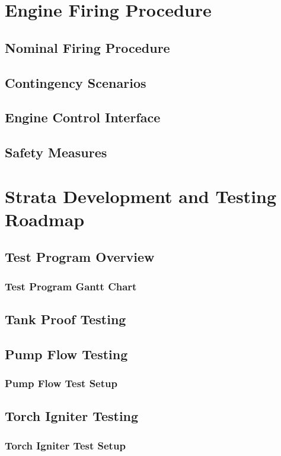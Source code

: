 \documentclass[12pt, letterpaper]{article}
\begin{document}
\section{Engine Firing Procedure}
\subsection{Nominal Firing Procedure}
\subsection{Contingency Scenarios}
\subsection{Engine Control Interface}
\subsection{Safety Measures}

\newpage

\section{Strata Development and Testing Roadmap}
\subsection{Test Program Overview}
\subsubsection{Test Program Gantt Chart}
\subsection{Tank Proof Testing}
\subsection{Pump Flow Testing}
\subsubsection{Pump Flow Test Setup}
\subsection{Torch Igniter Testing}
\subsubsection{Torch Igniter Test Setup}
\end{document}
